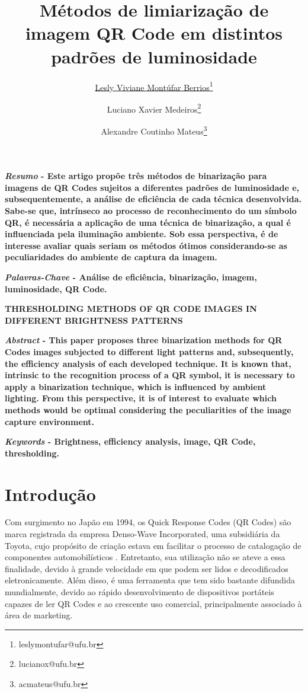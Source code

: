 \documentclass{ceel}
\title{Métodos de limiarização de imagem QR Code em distintos padrões de luminosidade}
\author[1]{\underline{Lesly Viviane Montúfar Berrios}\thanks{leslymontufar@ufu.br}}
\author[2]{Luciano Xavier Medeiros\thanks{lucianox@ufu.br}}
\author[2]{Alexandre Coutinho Mateus\thanks{acmateus@ufu.br}}
\affil[1]{FEELT - Universidade Federal de Uberlândia}
\affil[2]{FEELT - Professor Adjunto - Universidade Federal de Uberlândia}
\begin{document}
\inserirtitulo

\begin{multicols}{2}

\textbf{\emph{Resumo} - Este artigo propõe três métodos de binarização para imagens de QR Codes sujeitos a diferentes padrões de luminosidade e, subsequentemente, a análise de eficiência de cada técnica desenvolvida. Sabe-se que, intrínseco ao processo de reconhecimento do um símbolo QR, é necessária a aplicação de uma técnica de binarização, a qual é influenciada pela iluminação ambiente. Sob essa perspectiva, é de interesse avaliar quais seriam os métodos ótimos considerando-se as peculiaridades do ambiente de captura da imagem.}
\vspace*{10pt}

\textbf{\emph{Palavras-Chave} - Análise de eficiência, binarização, imagem, luminosidade, QR Code.}


\begin{center}
\noindent\textbf{\large \uppercase{Thresholding methods of QR Code images in different brightness patterns}}
\end{center}

\textbf{\emph{Abstract} - This paper proposes three binarization methods for QR Codes images subjected to different light patterns and, subsequently, the efficiency analysis of each developed technique. It is known that, intrinsic to the recognition process of a QR symbol, it is necessary to apply a binarization technique, which is influenced by ambient lighting. From this perspective, it is of interest to evaluate which methods would be optimal considering the peculiarities of the image capture environment.} 
\vspace*{10pt}

\textbf{\emph{Keywords} - Brightness, efficiency analysis, image, QR Code, thresholding.}

\section{Introdução}
Com surgimento no Japão em 1994, os Quick Response Codes (QR Codes) são marca registrada da empresa Denso-Wave Incorporated, uma subsidiária da Toyota, cujo propósito de criação estava em facilitar o processo de catalogação de componentes automobilísticos \cite{denso}. Entretanto, sua utilização não se ateve a essa finalidade, devido à grande velocidade em que podem ser lidos e decodificados eletronicamente. Além disso, é uma ferramenta que tem sido bastante difundida mundialmente, devido ao rápido desenvolvimento de dispositivos portáteis capazes de ler QR Codes e ao crescente uso comercial, principalmente associado à área de marketing.


\end{multicols}
\end{document}
